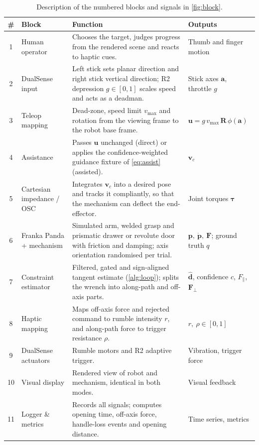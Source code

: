 \documentclass[11pt,letterpaper]{article}
\newcommand{\vect}[1]{\bm{#1}}
\newcommand{\vuser}{\vect{u}}
\newcommand{\vcmd}{\vect{v}_{c}}
\newcommand{\Fext}{\vect{F}}
\newcommand{\Fperp}{\vect{F}_{\perp}}
\newcommand{\Fpar}{F_{\parallel}}
\begin{document}
\begin{table}[tb]
\centering
\caption{Description of the numbered blocks and signals in \cref{fig:block}.}
\label{tab:blocks}
\footnotesize
\renewcommand{\arraystretch}{1.18}
\begin{tabularx}{\textwidth}{@{}c>{\raggedright\arraybackslash}p{2.7cm}>{\raggedright\arraybackslash}X>{\raggedright\arraybackslash}p{3.2cm}@{}}
\toprule
\textbf{\#} & \textbf{Block} & \textbf{Function} & \textbf{Outputs} \\
\midrule
1 & Human operator & Chooses the target, judges progress from the rendered scene and reacts to haptic cues. & Thumb and finger motion \\
2 & DualSense input & Left stick sets planar direction and right stick vertical direction; R2 depression $g\in[0,1]$ scales speed and acts as a deadman. & Stick axes $\vect a$, throttle $g$ \\
3 & Teleop mapping & Dead-zone, speed limit $v_{\max}$ and rotation from the viewing frame to the robot base frame. & $\vuser = g\,v_{\max}\,\mathbf{R}\,\phi(\vect a)$ \\
4 & Assistance & Passes $\vuser$ unchanged (direct) or applies the confidence-weighted guidance fixture of \eqref{eq:assist} (assisted). & $\vcmd$ \\
5 & Cartesian impedance / OSC & Integrates $\vcmd$ into a desired pose and tracks it compliantly, so that the mechanism can deflect the end-effector. & Joint torques $\bm\tau$ \\
6 & Franka Panda + mechanism & Simulated arm, welded grasp and prismatic drawer or revolute door with friction and damping; axis orientation randomised per trial. & $\vect p,\ \dot{\vect p},\ \Fext$; ground truth $q$ \\
7 & Constraint estimator & Filtered, gated and sign-aligned tangent estimate (\cref{alg:loop}); splits the wrench into along-path and off-axis parts. & $\hat{\vect d}$, confidence $c$, $\Fpar$, $\Fperp$ \\
8 & Haptic mapping & Maps off-axis force and rejected command to rumble intensity $r$, and along-path force to trigger resistance $\rho$. & $r,\ \rho\in[0,1]$ \\
9 & DualSense actuators & Rumble motors and R2 adaptive trigger. & Vibration, trigger force \\
10 & Visual display & Rendered view of robot and mechanism, identical in both modes. & Visual feedback \\
11 & Logger \& metrics & Records all signals; computes opening time, off-axis force, handle-loss events and opening distance. & Time series, metrics \\
\bottomrule
\end{tabularx}
\end{table}
\end{document}
